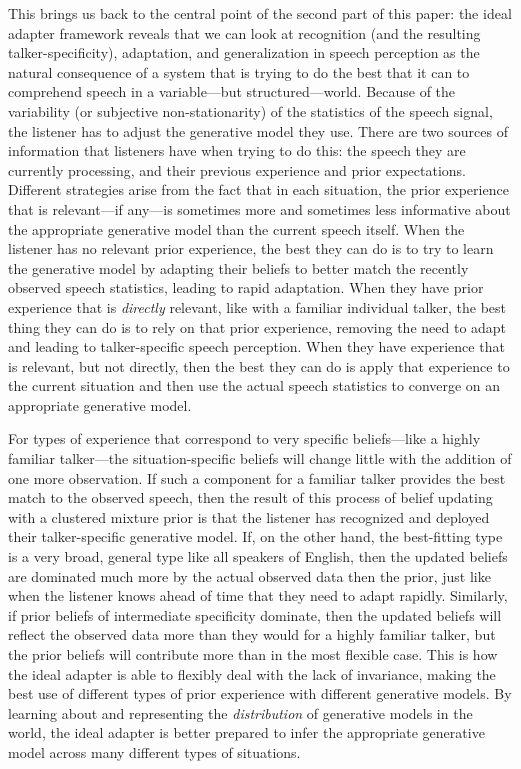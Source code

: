 This brings us back to the central point of the second part of this paper: 
the ideal adapter framework reveals that we can look at recognition (and the resulting talker-specificity), adaptation, and generalization in speech perception as the natural consequence of a system that is trying to do the best that it can to comprehend speech in a variable---but structured---world.  Because of the variability (or subjective non-stationarity) of the statistics of the speech signal, the listener has to adjust the generative model they use.  There are two sources of information that listeners have when trying to do this: the speech they are currently processing, and their previous experience and prior expectations.  Different strategies arise from the fact that in each situation, the prior experience that is relevant---if any---is sometimes more and sometimes less informative about the appropriate generative model than the current speech itself.  When the listener has no relevant prior experience, the best they can do is to try to learn the generative model by adapting their beliefs to better match the recently observed speech statistics, leading to rapid adaptation.  When they have prior experience that is \emph{directly} relevant, like with a familiar individual talker, the best thing they can do is to rely on that prior experience, removing the need to adapt and leading to talker-specific speech perception.  When they have experience that is relevant, but not directly, then the best they can do is apply that experience to the current situation and then use the actual speech statistics to converge on an appropriate generative model.
 
For types of experience that correspond to very specific beliefs---like a highly familiar talker---the situation-specific beliefs will change little with the addition of one more observation.  If such a component for a familiar talker provides the best match to the observed speech, then the result of this process of belief updating with a clustered mixture prior is that the listener has recognized and deployed their talker-specific generative model.  If, on the other hand, the best-fitting type is a very broad, general type like all speakers of English, then the updated beliefs are dominated much more by the actual observed data then the prior, just like when the listener knows ahead of time that they need to adapt rapidly.  Similarly, if prior beliefs of intermediate specificity dominate, then the updated beliefs will reflect the observed data more than they would for a highly familiar talker, but the prior beliefs will contribute more than in the most flexible case.   This is how the ideal adapter is able to flexibly deal with the lack of invariance, making the best use of different types of prior experience with different generative models.  By learning about and representing the \emph{distribution} of generative models in the world, the ideal adapter is better prepared to infer the appropriate generative model across many different types of situations.  


